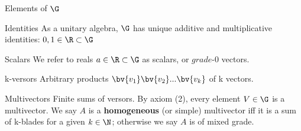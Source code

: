 \begin{definition}{Elements of $\G$}
    \begin{block}{Identities}
        As a unitary algebra, $\G$ has unique additive and multiplicative identities: $0, 1 \in \R \subset \G$
    \end{block}
    \begin{block}{Scalars}
        We refer to reals $a \in \R \subset \G$ as scalars, or $\textit{grade-0}$ vectors.
    \end{block}
    \begin{block}{k-versors}
        Arbitrary products $\bv{v_1}\bv{v_2}...\bv{v_k}$ of k vectors.
    \end{block}
    \begin{block}{Multivectors}
        Finite sums of versors. By axiom (2), every element $V \in \G$ is a multivector. We say $A$ is a \textbf{homogeneous} (or simple) multivector iff it is a sum of k-blades for a given $k \in \N$; otherwise we say $A$ is of mixed grade.
    \end{block}
\end{definition}
